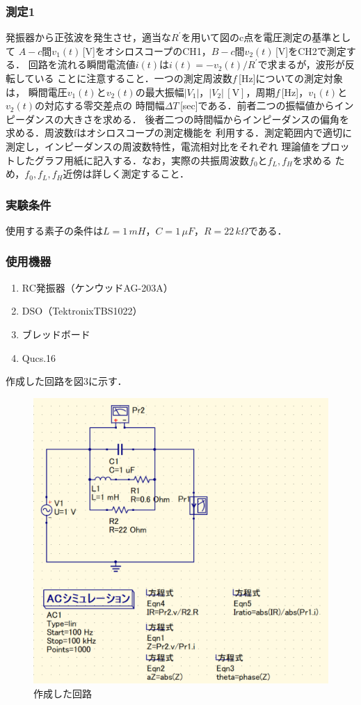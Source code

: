 \newpage

\subsubsection*{測定1}
発振器から正弦波を発生させ，適当な$R^{\prime}$を用いて図のc点を電圧測定の基準として
$A-c$間$v_1(t)$\,[V]をオシロスコープのCH1，$B-c$間$v_2(t)$\,[V]をCH2で測定する．
回路を流れる瞬間電流値$i(t)$は$i(t)= -v_2 (t)/R^{\prime}$で求まるが，波形が反転している
ことに注意すること．一つの測定周波数$f$\,[Hz]についての測定対象は，
瞬間電圧$v_1(t)$と$v_2(t)$の最大振幅$|V_1|$，$|V_2|\,[\si{\volt}]$，周期$f$\,[Hz]，$v_1(t)$と$v_2(t)$の対応する零交差点の
時間幅$ΔT$\,[sec]である．前者二つの振幅値からインピーダンスの大きさを求める．
後者二つの時間幅からインピーダンスの偏角を求める．周波数fはオシロスコープの測定機能を
利用する．測定範囲内で適切に測定し，インピーダンスの周波数特性，電流相対比をそれぞれ
理論値をプロットしたグラフ用紙に記入する．なお，実際の共振周波数$f_0$と$f_L,f_H$を求める
ため，$f_0,f_L,f_H$近傍は詳しく測定すること．

\subsubsection*{実験条件}
使用する素子の条件は$L = 1\,\si{mH}，C = 1\,\si{\mu F}，R = 22\,\si{k\Omega}$である．

\subsubsection*{使用機器}
\begin{enumerate}
    \item RC発振器（ケンウッド\quad AG-203A）
    \item DSO（Tektronix\quad TBS1022）
    \item ブレッドボード
    \item Qucs.16
\end{enumerate}

作成した回路を図3に示す．

\begin{figure}[H]
    \begin{center}
        \includegraphics[scale=0.5]{figure3.pdf}
        \caption{作成した回路}
    \end{center}
\end{figure}